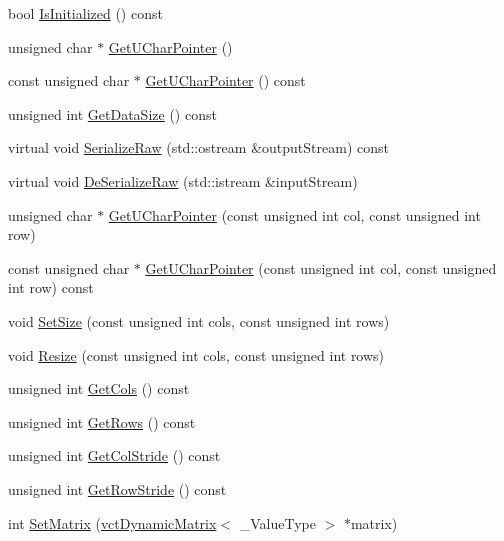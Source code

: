 \begin{DoxyCompactItemize}
bool \hyperlink{classsvl_sample_matrix_custom_ace04bc8913fa421ebf8180329a49b910}{Is\+Initialized} () const 
\item 
unsigned char $\ast$ \hyperlink{classsvl_sample_matrix_custom_aca62ad757577c504eed6c40e91b2c53e}{Get\+U\+Char\+Pointer} ()
\item 
const unsigned char $\ast$ \hyperlink{classsvl_sample_matrix_custom_af18255e854d6fd1bcf3f5741bf321300}{Get\+U\+Char\+Pointer} () const 
\item 
unsigned int \hyperlink{classsvl_sample_matrix_custom_a6d80633f000dbd7c61f3b71bd12959fb}{Get\+Data\+Size} () const 
\item 
virtual void \hyperlink{classsvl_sample_matrix_custom_a1f626841e5db3258f74b272f26f04757}{Serialize\+Raw} (std\+::ostream \&output\+Stream) const 
\item 
virtual void \hyperlink{classsvl_sample_matrix_custom_aeb99f06139dd9fe01a28ea7e0414fc92}{De\+Serialize\+Raw} (std\+::istream \&input\+Stream)
\item 
unsigned char $\ast$ \hyperlink{classsvl_sample_matrix_custom_a140b13a3ee4fee5771f8803bfcbeb046}{Get\+U\+Char\+Pointer} (const unsigned int col, const unsigned int row)
\item 
const unsigned char $\ast$ \hyperlink{classsvl_sample_matrix_custom_af9e5c528ad0927d1b72d874017e9b4d6}{Get\+U\+Char\+Pointer} (const unsigned int col, const unsigned int row) const 
\item 
void \hyperlink{classsvl_sample_matrix_custom_acbf8cbd00acde9dbd22434372d651225}{Set\+Size} (const unsigned int cols, const unsigned int rows)
\item 
void \hyperlink{classsvl_sample_matrix_custom_a485c9822109d0c2dc257fd03d73e2f59}{Resize} (const unsigned int cols, const unsigned int rows)
\item 
unsigned int \hyperlink{classsvl_sample_matrix_custom_ada65ca3cc61fbc4e688f7d485e4fa607}{Get\+Cols} () const 
\item 
unsigned int \hyperlink{classsvl_sample_matrix_custom_a95e6ed875150bdd72045a262736809cd}{Get\+Rows} () const 
\item 
unsigned int \hyperlink{classsvl_sample_matrix_custom_a82d216488b83a47d6e5020597036321d}{Get\+Col\+Stride} () const 
\item 
unsigned int \hyperlink{classsvl_sample_matrix_custom_af0ed63879128fed0d50c9ce14ab1eb6f}{Get\+Row\+Stride} () const 
\item 
int \hyperlink{classsvl_sample_matrix_custom_a8cb4ba39cc4dc0db843591711a096319}{Set\+Matrix} (\hyperlink{classvct_dynamic_matrix}{vct\+Dynamic\+Matrix}$<$ \+\_\+\+Value\+Type $>$ $\ast$matrix)

\end{DoxyCompactItemize}
